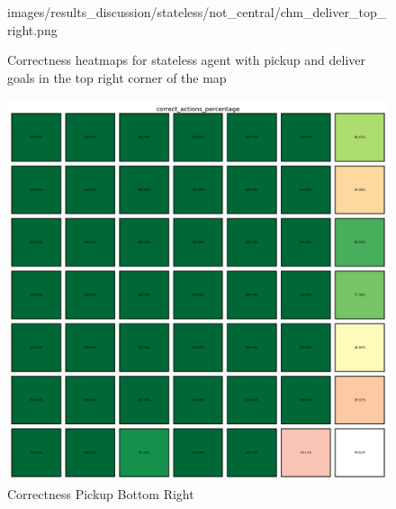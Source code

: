 \begin{figure}[ht]
\begin{minipage}[b]{0.45\textwidth}
{      images/results_discussion/stateless/not_central/chm_deliver_top_right.png
    }
    \caption{Correctness Deliver Top Right}
    \label{fig:chm_deliver_top_right}
  \end{minipage}
  \caption{Correctness heatmaps for stateless agent with pickup and deliver
  goals in the top right corner of the map}
  \label{fig:stateless_top_right_correctness}
\end{figure}
\vspace{5mm}

\vspace{5mm}
\begin{figure}[ht]
  \centering
  \begin{minipage}[b]{0.45\textwidth}
    \centering
    \includegraphics[width=\textwidth]{
      images/results_discussion/stateless/not_central/chm_pickup_bottom_right.png
    }
    \caption{Correctness Pickup Bottom Right}
    \label{fig:chm_pickup_bottom_right}
  \end{minipage}
  \hfill
  \begin{minipage}[b]{0.45\textwidth}
    \centering

\end{minipage}
\end{figure}
